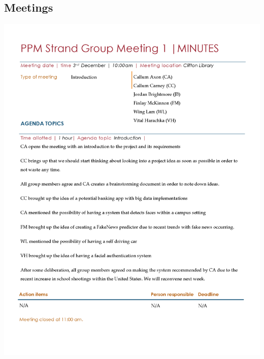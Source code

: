 \documentclass[
  english,
  a4paper,
,tablecaptionabove
]{scrartcl}
\begin{document}
\hypertarget{meetings-1}{%
\subsection{Meetings}\label{meetings-1}}

\includegraphics{images/ppm-images/meeting-1.png} \newpage
\end{document}

